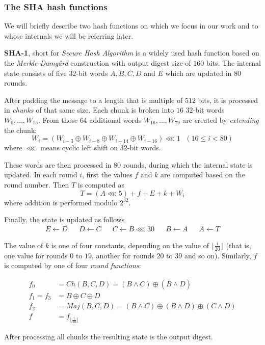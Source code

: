 \subsubsection{The SHA hash functions}
We will briefly describe two hash functions on which we focus in our work and to whose internals we will be referring later.

\textbf{SHA-1}, short for \emph{Secure Hash Algorithm} \cite{NIST1995FIPS180-1} is a widely used hash function based on the \emph{Merkle-Damg\aa rd} construction \cite{merkle1979secrecy} with output digest size of $160$ bits.
The internal state consists of five $32$-bit words $A, B, C, D$ and $E$ which are updated in $80$ rounds.

After padding the message to a length that is multiple of $512$ bits, it is processed in \emph{chunks} of that same size.
Each chunk is broken into $16$ $32$-bit words $W_0, \dots, W_{15}$.
From those $64$ additional words $W_{16}, \dots, W_{79}$ are created by \emph{extending} the chunk:
\[
W_i = (W_{i-3} \oplus W_{i-8} \oplus W_{i-14} \oplus W_{i-16}) \lll 1 ~~~ (16 \le i < 80)
\]
where $\lll$ means cyclic left shift on $32$-bit words.

These words are then processed in $80$ rounds, during which the internal state is updated.
In each round $i$, first the values $f$ and $k$ are computed based on the round number.
Then $T$ is computed as
\[
T = (A \lll 5) + f + E + k + W_i
\]
where addition is performed modulo $2^{32}$.

Finally, the state is updated as follows
\begin{align*}
E \gets D& &D \gets C& &C \gets B \lll 30& &B \gets A& &A \gets T
\end{align*}

The value of $k$ is one of four constants, depending on the value of $\lfloor \frac{i}{20} \rfloor$ (that is, one value for rounds $0$ to $19$, another for rounds $20$ to $39$ and so on).
Similarly, $f$ is computed by one of four \emph{round functions}:

\begin{align*}
f_0 &= Ch(B, C, D) = (B \land C) \oplus (\overline{B} \land D) \\
f_1 = f_3 &= B \oplus C \oplus D \\
f_2 &= Maj(B, C, D) = (B \land C) \oplus (B \land D) \oplus (C \land D)\\
f &= f_{\lfloor \frac{i}{20} \rfloor}
\end{align*}

After processing all chunks the resulting state is the output digest.

